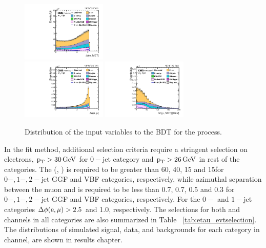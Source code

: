 \begin{figure}[htbp!]
  \includegraphics[width=0.36\textwidth]{plots/chapter6/emu/dPhiEMET.pdf}\\
  \includegraphics[width=0.36\textwidth]{plots/chapter6/emu/dPhiEMu.pdf}
  \includegraphics[width=0.36\textwidth]{plots/chapter6/emu/MTMuMET.pdf}\\
  \caption{Distribution of the input variables to the BDT for the \Hemu process.}
  \label{fig:input_em}
\end{figure}

In the \mcol fit method, additional selection criteria require a stringent selection on electrons, $\text{p}_\text{T} > 30\,\text{Ge\hspace{-.08em}V}$ for $0-$jet category and $\text{p}_\text{T} > 26\,\text{Ge\hspace{-.08em}V}$ in rest of the categories. The \mt(\Pe, \ptvecmiss) is required to be greater than 60, 40, 15 and 15\GeV for $0-, 1-, 2-$jet GGF and VBF categories, respectively, while azimuthal separation between the muon and \ptvecmiss is required to be less than 0.7, 0.7, 0.5 and 0.3 for $0-, 1-, 2-$jet GGF and VBF categories, respectively. For the $0-$ and $1-$jet categories $\Delta\phi(\text{e},\mu) > 2.5$ and 1.0, respectively. The selections for both \Hehad and \Hemu channels in all categories are also summarized in Table ~\ref{tab:etau_evtselection}. The \mcol distributions of simulated signal, data, and backgrounds for each category in \Hemu channel, are shown in results chapter.

